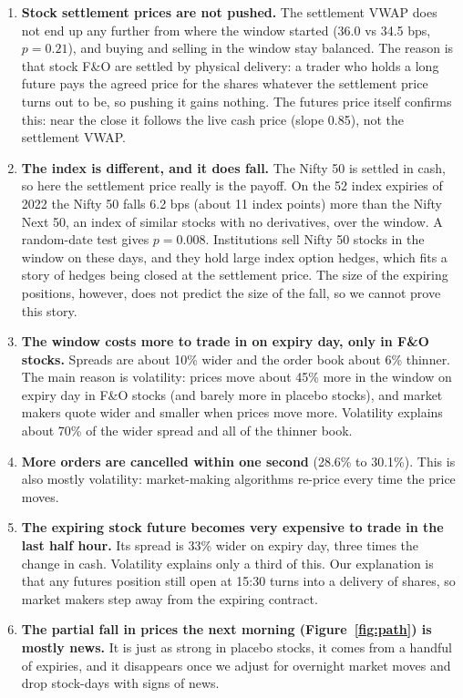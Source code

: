 \documentclass[11pt,a4paper]{article}
\begin{document}
\begin{enumerate}
  \item \textbf{Stock settlement prices are not pushed.} The settlement VWAP does not end up any
  further from where the window started (36.0 vs 34.5 bps, $p = 0.21$), and buying and selling in
  the window stay balanced. The reason is that stock F\&O are settled by physical delivery: a
  trader who holds a long future pays the agreed price for the shares whatever the settlement
  price turns out to be, so pushing it gains nothing. The futures price itself confirms this:
  near the close it follows the live cash price (slope 0.85), not the settlement VWAP.
  \item \textbf{The index is different, and it does fall.} The Nifty 50 is settled in cash, so
  here the settlement price really is the payoff. On the 52 index expiries of 2022 the Nifty 50
  falls 6.2 bps (about 11 index points) more than the Nifty Next 50, an index of similar stocks
  with no derivatives, over the window. A random-date test gives $p = 0.008$. Institutions sell
  Nifty 50 stocks in the window on these days, and they hold large index option hedges, which
  fits a story of hedges being closed at the settlement price. The size of the expiring
  positions, however, does not predict the size of the fall, so we cannot prove this story.
  \item \textbf{The window costs more to trade in on expiry day, only in F\&O stocks.} Spreads are
  about 10\% wider and the order book about 6\% thinner. The main reason is volatility: prices
  move about 45\% more in the window on expiry day in F\&O stocks (and barely more in placebo
  stocks), and market makers quote wider and smaller when prices move more. Volatility explains
  about 70\% of the wider spread and all of the thinner book.
  \item \textbf{More orders are cancelled within one second} (28.6\% to 30.1\%). This is also mostly
  volatility: market-making algorithms re-price every time the price moves.
  \item \textbf{The expiring stock future becomes very expensive to trade in the last half hour.}
  Its spread is 33\% wider on expiry day, three times the change in cash. Volatility explains only
  a third of this. Our explanation is that any futures position still open at 15:30 turns into a
  delivery of shares, so market makers step away from the expiring contract.
  \item \textbf{The partial fall in prices the next morning (Figure~\ref{fig:path}) is mostly
  news.} It is just as strong in placebo stocks, it comes from a handful of expiries, and it
  disappears once we adjust for overnight market moves and drop stock-days with signs of news.
\end{enumerate}
\end{document}
